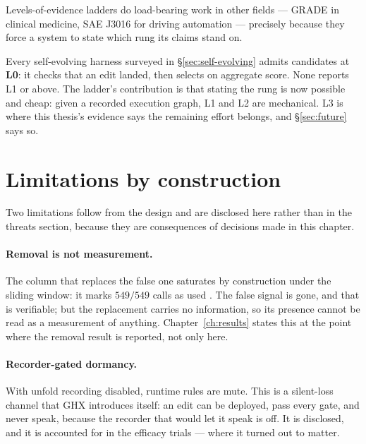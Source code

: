 Levels-of-evidence ladders do load-bearing work in other fields --- GRADE
in clinical medicine, SAE J3016 for driving automation --- precisely
because they force a system to state which rung its claims stand on.

Every self-evolving harness surveyed in \S\ref{sec:self-evolving} admits
candidates at \textbf{L0}: it checks that an edit landed, then selects on
aggregate score. None reports L1 or above. The ladder's contribution is
that stating the rung is now possible and cheap: given a recorded execution
graph, L1 and L2 are mechanical. L3 is where this thesis's evidence says
the remaining effort belongs, and \S\ref{sec:future} says so.

\section{Limitations by construction}
\label{sec:construction-limits}

Two limitations follow from the design and are disclosed here rather than
in the threats section, because they are consequences of decisions made in
this chapter.

\paragraph{Removal is not measurement.} The column that replaces the false
one saturates by construction under the sliding window: it marks
$549/549$ calls as used . The false signal is gone, and that is
verifiable; but the replacement carries no information, so its presence
cannot be read as a measurement of anything. Chapter~\ref{ch:results} states
this at the point where the removal result is reported, not only here.

\paragraph{Recorder-gated dormancy.} With unfold recording disabled,
runtime rules are mute. This is a silent-loss channel that GHX introduces
itself: an edit can be deployed, pass every gate, and never speak, because
the recorder that would let it speak is off. It is disclosed, and it is
accounted for in the efficacy trials  --- where it turned out to
matter.
